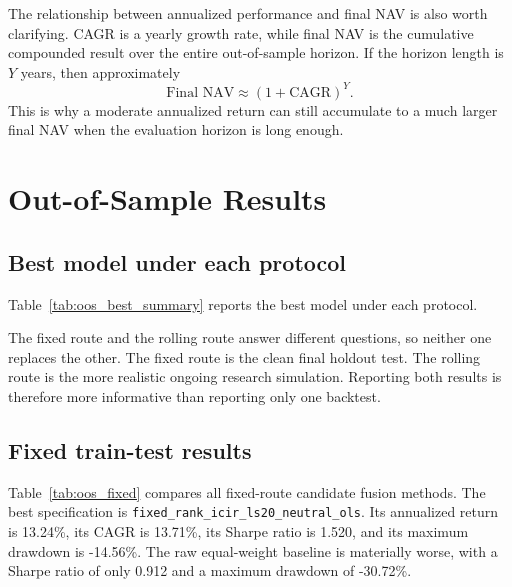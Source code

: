 \documentclass[11pt]{article}
\begin{document}
The relationship between annualized performance and final NAV is also worth clarifying. CAGR is a yearly growth rate, while final NAV is the cumulative compounded result over the entire out-of-sample horizon. If the horizon length is \(Y\) years, then approximately
\[
\text{Final NAV}\approx (1+\text{CAGR})^Y.
\]
This is why a moderate annualized return can still accumulate to a much larger final NAV when the evaluation horizon is long enough.

\section{Out-of-Sample Results}

\subsection{Best model under each protocol}

Table~\ref{tab:oos_best_summary} reports the best model under each protocol.

\begin{table}[H]
\centering
\caption{Best out-of-sample model under each evaluation protocol}
\label{tab:oos_best_summary}
\resizebox{\textwidth}{!}{}
\end{table}

The fixed route and the rolling route answer different questions, so neither one replaces the other. The fixed route is the clean final holdout test. The rolling route is the more realistic ongoing research simulation. Reporting both results is therefore more informative than reporting only one backtest.

\subsection{Fixed train-test results}

Table~\ref{tab:oos_fixed} compares all fixed-route candidate fusion methods. The best specification is \texttt{fixed\_rank\_icir\_ls20\_neutral\_ols}. Its annualized return is 13.24\%, its CAGR is 13.71\%, its Sharpe ratio is 1.520, and its maximum drawdown is -14.56\%. The raw equal-weight baseline is materially worse, with a Sharpe ratio of only 0.912 and a maximum drawdown of -30.72\%.

\begin{table}[H]
\centering
\caption{Fixed train-test OOS comparison, 2022--2026}
\label{tab:oos_fixed}
\resizebox{\textwidth}{!}{}
\end{table}
\end{document}
